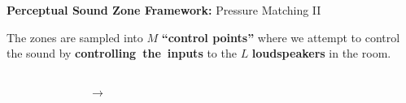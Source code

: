 \documentclass[aspectratio=169]{beamer}
\begin{document}
\begin{frame}{\textbf{Perceptual Sound Zone Framework:} Pressure Matching II}
    \begin{center}
        The zones are sampled into $M$ \textbf{``control points''} where we attempt to control the sound by \textbf{controlling~the~inputs} to the $L$ \textbf{loudspeakers} in the room.
    \end{center}
    \begin{columns}[c]
        \centering
        \begin{figure}[]
            \centering
            \scalebox{0.6}{}
        \end{figure}
        \begin{center}
            \Huge$\rightarrow$
        \end{center}
        \begin{figure}[]
            \centering
            \scalebox{0.6}{}
        \end{figure}
    \end{columns}
\end{frame}
\end{document}
